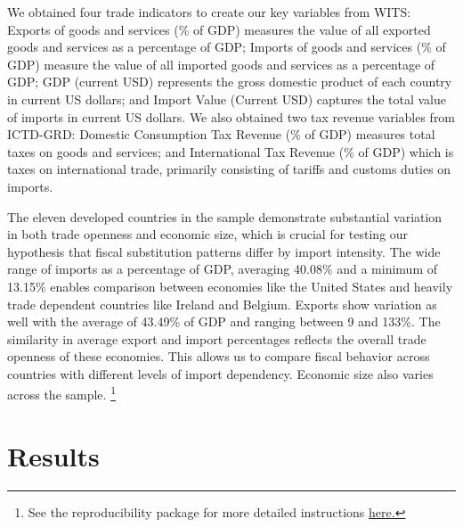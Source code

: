 \documentclass[12pt]{article}
\begin{document}
We obtained four trade indicators to create our key variables from WITS: Exports of goods and services (\% of GDP) measures the value of all exported goods and services as a percentage of GDP; Imports of goods and services (\% of GDP) measure the value of all imported goods and services as a percentage of GDP; GDP (current USD) represents the gross domestic product of each country in current US dollars; and Import Value (Current USD) captures the total value of imports in current US dollars. 
We also obtained two tax revenue variables from ICTD-GRD: Domestic Consumption Tax Revenue (\% of GDP) measures total taxes on goods and services; and International Tax Revenue (\% of GDP) which is taxes on international trade, primarily consisting of tariffs and customs duties on imports.

        The eleven developed countries in the sample demonstrate substantial variation in both trade openness and economic size, which is crucial for testing our hypothesis that fiscal substitution patterns differ by import intensity. The wide range of imports as a percentage of GDP, averaging 40.08\% and a minimum of 13.15\% enables comparison between economies like the United States and heavily trade dependent countries like Ireland and Belgium. Exports show variation as well with the average of 43.49\% of GDP and ranging between 9 and 133\%. The similarity in average export and import percentages reflects the overall trade openness of these economies. This allows us to compare fiscal behavior across countries with different levels of import dependency. 
        Economic size also varies across the sample. 
\footnote{See the reproducibility package for more detailed instructions 
\protect\href{https://github.com/ecn310/course-project-tariffs/tree/main/Report\#readme}{here.}} 

         

\section{Results}
\label{sec:result}

\setlength{\pdfpagewidth}{8.5in} \setlength{\pdfpageheight}{11in}
\end{document}
